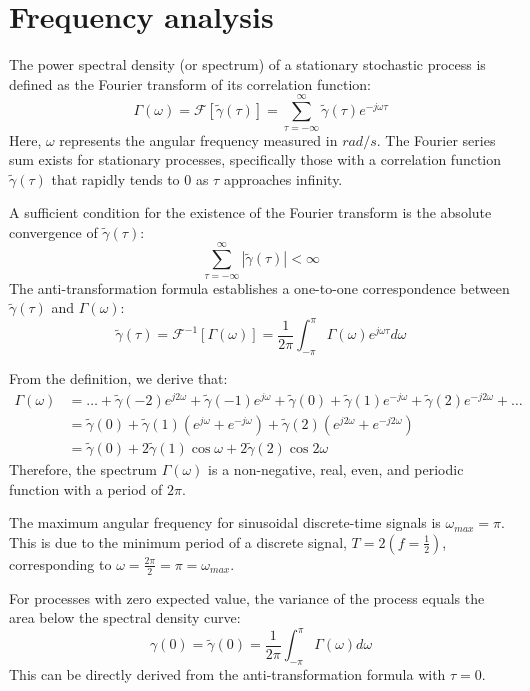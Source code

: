 \section{Frequency analysis}

The power spectral density (or spectrum) of a stationary stochastic process is defined as the Fourier transform of its correlation function:
\[\Gamma (\omega)=\mathcal{F} \left[ \tilde{\gamma}(\tau) \right]=\sum_{\tau = -\infty}^{\infty}\tilde{\gamma}(\tau)e^{-j\omega\tau}\]
Here, $\omega$ represents the angular frequency measured in $rad/s$. 
The Fourier series sum exists for stationary processes, specifically those with a correlation function $\tilde{\gamma}(\tau)$ that rapidly tends to 0 as $\tau$ approaches infinity.

A sufficient condition for the existence of the Fourier transform is the absolute convergence of $\tilde{\gamma}(\tau)$:
\[\sum_{\tau=-\infty}^{\infty}\left\lvert \tilde{\gamma}(\tau) \right\rvert < \infty\]
The anti-transformation formula establishes a one-to-one correspondence between $\tilde{\gamma}(\tau)$ and $\Gamma (\omega)$: 
\[\tilde{\gamma}(\tau)=\mathcal{F}^{-1}\left[ \Gamma (\omega) \right]=\dfrac{1}{2\pi}\int_{-\pi}^{\pi}\Gamma(\omega)e^{j\omega\tau}d\omega\]

From the definition, we derive that:
\begin{align*}
    \Gamma(\omega)  &=\dots+\tilde{\gamma}(-2)e^{j2\omega}+\tilde{\gamma}(-1)e^{j\omega}+\tilde{\gamma}(0)+\tilde{\gamma}(1)e^{-j\omega}+\tilde{\gamma}(2)e^{-j2\omega}+\dots \\
                    &=\tilde{\gamma}(0)+\tilde{\gamma}(1)(e^{j\omega}+e^{-j\omega})+\tilde{\gamma}(2)(e^{j2\omega}+e^{-j2\omega}) \\
                    &=\tilde{\gamma}(0)+2\tilde{\gamma}(1)\cos\omega+2\tilde{\gamma}(2)\cos2\omega 
\end{align*}
Therefore, the spectrum $\Gamma(\omega)$ is a non-negative, real, even, and periodic function with a period of $2\pi$. 

The maximum angular frequency for sinusoidal discrete-time signals is $\omega_{max} = \pi$.
This is due to the minimum period of a discrete signal, $T = 2 \left(f = \frac{1}{2}\right)$, corresponding to $\omega = \frac{2\pi}{2} = \pi = \omega_{max}$.

For processes with zero expected value, the variance of the process equals the area below the spectral density curve:
\[\gamma(0)=\tilde{\gamma}(0)=\dfrac{1}{2\pi}\int_{-\pi}^{\pi}\Gamma(\omega)d\omega\]
This can be directly derived from the anti-transformation formula with $\tau = 0$.


